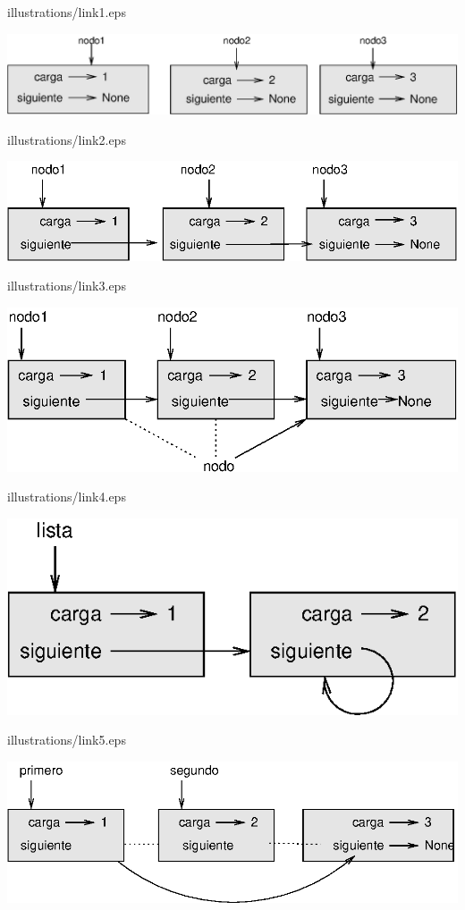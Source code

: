 illustrations/link1.eps

\centerline{\includegraphics{illustrations/link1.eps}}

illustrations/link2.eps

\centerline{\includegraphics{illustrations/link2.eps}}

illustrations/link3.eps

\centerline{\includegraphics{illustrations/link3.eps}}

illustrations/link4.eps

\centerline{\includegraphics{illustrations/link4.eps}}

illustrations/link5.eps

\centerline{\includegraphics{illustrations/link5.eps}}


